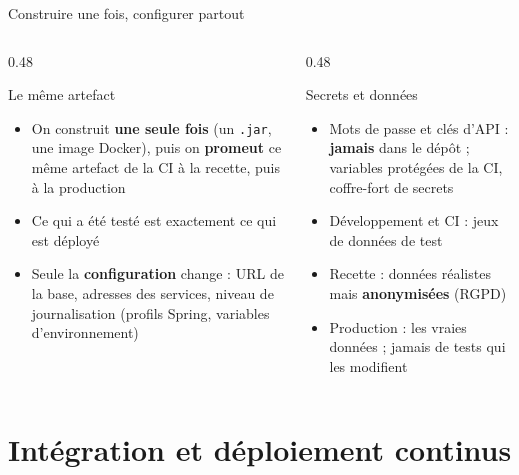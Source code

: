 \documentclass[aspectratio=169,10pt]{beamer}
\begin{document}
\begin{frame}{Construire une fois, configurer partout}
  \begin{columns}[T]
    \begin{column}{0.48\textwidth}
      \begin{block}{Le même artefact}
        \begin{itemize}
          \item On construit \textbf{une seule fois} (un \texttt{.jar}, une image Docker), puis on \textbf{promeut} ce même artefact de la CI à la recette, puis à la production
          \item Ce qui a été testé est exactement ce qui est déployé
          \item Seule la \textbf{configuration} change : URL de la base, adresses des services, niveau de journalisation (profils Spring, variables d'environnement)
        \end{itemize}
      \end{block}
    \end{column}
    \begin{column}{0.48\textwidth}
      \begin{alertblock}{Secrets et données}
        \begin{itemize}
          \item Mots de passe et clés d'API : \textbf{jamais} dans le dépôt ; variables protégées de la CI, coffre-fort de secrets
          \item Développement et CI : jeux de données de test
          \item Recette : données réalistes mais \textbf{anonymisées} (RGPD)
          \item Production : les vraies données ; jamais de tests qui les modifient
        \end{itemize}
      \end{alertblock}
    \end{column}
  \end{columns}
\end{frame}

\section{Intégration et déploiement continus}
\end{document}
